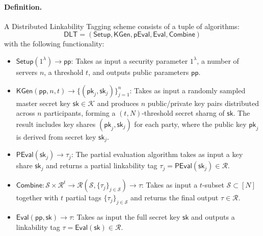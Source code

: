 \paragraph{Definition.} A Distributed Linkability Tagging scheme consists of a tuple of algorithms:
\[
{\mathsf{DLT}} = (\mathsf{Setup}, \mathsf{KGen}, \mathsf{pEval}, \mathsf{Eval}, \mathsf{Combine})
\]
with the following functionality:
\begin{itemize}
    \item $\mathsf{Setup}(1^\lambda) \rightarrow \mathsf{pp}$: Takes as input a security parameter $1^\lambda$, a number of servers $n$, a threshold $t$, and outputs public parameters $\mathsf{pp}$.
    
     \item $\mathsf{KGen}(\mathsf{pp}, n, t) \rightarrow \{(\mathsf{pk}_j, \mathsf{sk}_j)\}_{j=1}^n$: Takes as input a randomly sampled master secret key $\mathsf{sk} \in \mathcal{K}$ and produces $n$ public/private key pairs distributed across $n$ participants, forming a $(t,N)$-threshold secret sharng of $\mathsf{sk}$. The result includes key shares $(\mathsf{pk}_j, \mathsf{sk}_j)$ for each party, where the public key $\mathsf{pk}_j$ is derived from secret key $\mathsf{sk}_j$.

     \item $\mathsf{PEval}(\mathsf{sk}_j) \rightarrow \tau_j$: The partial evaluation algorithm takes as input a key share $\mathsf{sk}_j$ and returns a partial linkability tag $\tau_j = \mathsf{PEval}(\mathsf{sk}_j) \in \mathcal{R}$.

     \item $\mathsf{Combine} : \mathcal{S} \times \mathcal{R}^t \rightarrow \mathcal{R} (\mathcal{S},\{\tau_j\}_{j \in \mathcal{S}}) \rightarrow \tau$: Takes as input a $t$-subset $\mathcal{S} \subset [N]$ together with $t$ partial tags $\{\tau_j\}_{j \in \mathcal{S}}$ and returns the final output $\tau \in \mathcal{R}$.

     \item $\mathsf{Eval}(\mathsf{pp}, \mathsf{sk}) \rightarrow \tau$: Takes as input the full secret key $\mathsf{sk}$ and outputs a linkability tag $\tau= \mathsf{Eval}(\mathsf{sk}) \in \mathcal{R}$.
      
\end{itemize}


